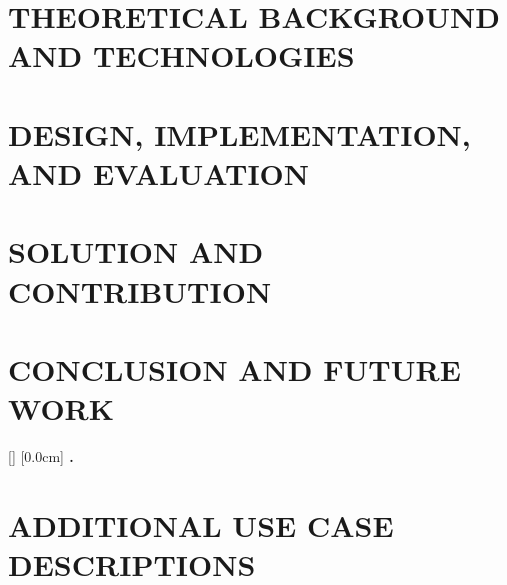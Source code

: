 \documentclass[a4paper,13pt,3p,twoside]{report}
\renewcommand{\bibname}{reference}
\renewcommand{\figurename}{Figure}
\renewcommand{\tablename}{Table}
\renewcommand{\chaptername}{CHAPTER}
\theoremstyle{definition}
\begin{document}
\newpage
\chapter{THEORETICAL BACKGROUND AND TECHNOLOGIES}
\label{chapter:Background}


\newpage
\chapter{DESIGN, IMPLEMENTATION, AND EVALUATION}
\label{chapter:Design}


\newpage
\chapter{SOLUTION AND CONTRIBUTION}
\label{chapter:Contribution}


\newpage
\chapter{CONCLUSION AND FUTURE WORK}
\label{chapter:Conclusion}


\newpage
\renewcommand\bibname{REFERENCE}
\printbibliography
{}

\appendixpage
\appendices
\addappheadtotoc
\renewcommand{\figurename}{Figure}
\renewcommand{\tablename}{Table}
\renewcommand{\chaptername}{CHAPTER}

[]
\titlespacing*{\chapter}{0pt}{-20pt}{20pt}
[0.0cm]{\bfseries\vspace{0.3cm}}{{\bfseries{\scshape} \thecontentslabel.\ }}{}{\contentspage}

\chapter{ADDITIONAL USE CASE DESCRIPTIONS}

\end{document}
